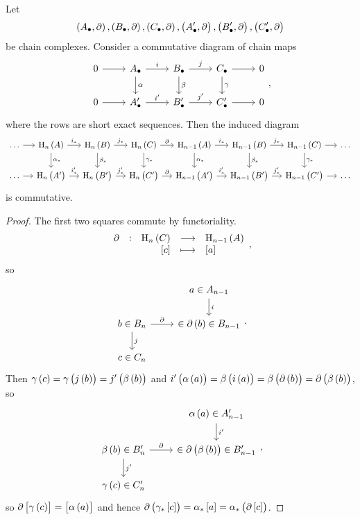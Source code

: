 \begin{proposition}
Let
$$ \br{A_\bullet, \da}, \br{B_\bullet, \da}, \br{C_\bullet, \da}, \br{A_\bullet', \da}, \br{B_\bullet', \da}, \br{C_\bullet', \da} $$
be chain complexes. Consider a commutative diagram of chain maps
$$
\begin{tikzcd}
0 \arrow{r} & A_\bullet \arrow{r}{i} \arrow{d}{\alpha} & B_\bullet \arrow{r}{j} \arrow{d}{\beta} & C_\bullet \arrow{r} \arrow{d}{\gamma} & 0 \\
0 \arrow{r} & A_\bullet' \arrow{r}{i'} & B_\bullet' \arrow{r}{j'} & C_\bullet' \arrow{r} & 0
\end{tikzcd},
$$
where the rows are short exact sequences. Then the induced diagram
$$
\begin{tikzcd}[column sep=small]
\dots \arrow{r} & \H_n\br{A} \arrow{r}{i_*} \arrow{d}{\alpha_*} & \H_n\br{B} \arrow{r}{j_*} \arrow{d}{\beta_*} & \H_n\br{C} \arrow{r}{\da} \arrow{d}{\gamma_*} & \H_{n - 1}\br{A} \arrow{r}{i_*} \arrow{d}{\alpha_*} & \H_{n - 1}\br{B} \arrow{r}{j_*} \arrow{d}{\beta_*} & \H_{n - 1}\br{C} \arrow{r} \arrow{d}{\gamma_*} & \dots \\
\dots \arrow{r} & \H_n\br{A'} \arrow{r}{i_*'} & \H_n\br{B'} \arrow{r}{j_*'} & \H_n\br{C'} \arrow{r}{\da} & \H_{n - 1}\br{A'} \arrow{r}{i_*'} & \H_{n - 1}\br{B'} \arrow{r}{j_*'} & \H_{n - 1}\br{C'} \arrow{r} & \dots
\end{tikzcd}
$$
is commutative.
\end{proposition}

\begin{proof}
The first two squares commute by functoriality.
$$ \function[\da]{\H_n\br{C}}{\H_{n - 1}\br{A}}{\sbr{c}}{\sbr{a}}, $$
so
$$
\begin{tikzcd}
& a \in A_{n - 1} \arrow{d}{i} \\
b \in B_n \arrow{r}{\da} \arrow{d}{j} & \in \da\br{b} \in B_{n - 1} \\
c \in C_n &
\end{tikzcd}.
$$
Then $ \gamma\br{c} = \gamma\br{j\br{b}} = j'\br{\beta\br{b}} $ and $ i'\br{\alpha\br{a}} = \beta\br{i\br{a}} = \beta\br{\da\br{b}} = \da\br{\beta\br{b}} $, so
$$
\begin{tikzcd}
& \alpha\br{a} \in A_{n - 1}' \arrow{d}{i'} \\
\beta\br{b} \in B_n' \arrow{r}{\da} \arrow{d}{j'} & \in \da\br{\beta\br{b}} \in B_{n - 1}' \\
\gamma\br{c} \in C_n' &
\end{tikzcd},
$$
so $ \da\sbr{\gamma\br{c}} = \sbr{\alpha\br{a}} $ and hence $ \da\br{\gamma_*\sbr{c}} = \alpha_*\sbr{a} = \alpha_*\br{\da\sbr{c}} $.
\end{proof}

